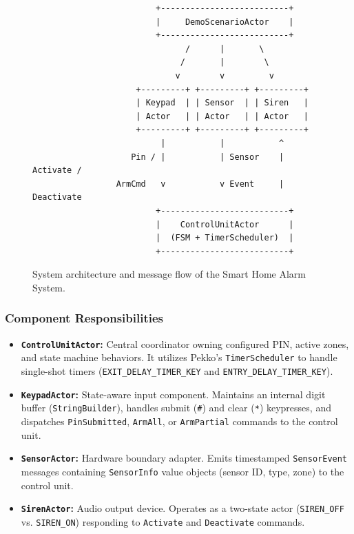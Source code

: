 \documentclass[11pt,a4paper]{article}
\begin{document}
\begin{figure}[h]
\centering
\begin{small}
\begin{verbatim}
                         +--------------------------+
                         |     DemoScenarioActor    |
                         +--------------------------+
                               /      |       \
                              /       |        \
                             v        v         v
                     +---------+ +---------+ +---------+
                     | Keypad  | | Sensor  | | Siren   |
                     | Actor   | | Actor   | | Actor   |
                     +---------+ +---------+ +---------+
                          |           |           ^
                    Pin / |           | Sensor    | Activate /
                 ArmCmd   v           v Event     | Deactivate
                         +--------------------------+
                         |    ControlUnitActor      |
                         |  (FSM + TimerScheduler)  |
                         +--------------------------+
\end{verbatim}
\end{small}
\caption{System architecture and message flow of the Smart Home Alarm System.}
\label{fig:shas-arch}
\end{figure}

\subsubsection{Component Responsibilities}

\begin{itemize}[leftmargin=*]
    \item \textbf{\texttt{ControlUnitActor}:} Central coordinator owning configured PIN, active zones, and state machine behaviors. It utilizes Pekko's \texttt{TimerScheduler} to handle single-shot timers (\texttt{EXIT\_DELAY\_TIMER\_KEY} and \texttt{ENTRY\_DELAY\_TIMER\_KEY}).
    \item \textbf{\texttt{KeypadActor}:} State-aware input component. Maintains an internal digit buffer (\texttt{StringBuilder}), handles submit (\texttt{\#}) and clear (\texttt{*}) keypresses, and dispatches \texttt{PinSubmitted}, \texttt{ArmAll}, or \texttt{ArmPartial} commands to the control unit.
    \item \textbf{\texttt{SensorActor}:} Hardware boundary adapter. Emits timestamped \texttt{SensorEvent} messages containing \texttt{SensorInfo} value objects (sensor ID, type, zone) to the control unit.
    \item \textbf{\texttt{SirenActor}:} Audio output device. Operates as a two-state actor (\texttt{SIREN\_OFF} vs. \texttt{SIREN\_ON}) responding to \texttt{Activate} and \texttt{Deactivate} commands.
\end{itemize}
\end{document}
